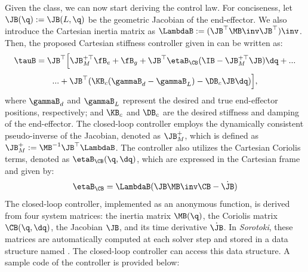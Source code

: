 Given the  class, we can now start deriving the control law. For conciseness, let $\JB(\q) := \JB(L,\q)$ be the geometric Jacobian of the end-effector. We also introduce the Cartesian inertia matrix as $\LambdaB := (\JB^\top \MB \inv \JB^\top)\inv$. Then, the proposed Cartesian stiffness controller given in \cite{DellaSantina2019Nov} can be written as:
%
\begin{multline}
    \tauB = \JB^\top \Big[\JB_M^{+\top} \fB_{e} + \fB_{g} + \JB^\top \etaB_{\CB}(\IB - \JB_M^{+\top}\JB)\dq + ... \\[0.25em] ... + \JB^\top(\KB_{c} (\gammaB_d - \gammaB_L) - \DB_c \JB \dq) \Big ],
    \label{eq:C5:dellasantina_controller}
\end{multline}
%
where $\gammaB_d$ and $\gammaB_L$ represent the desired and true end-effector positions, respectively; and $\KB_c$ and $\DB_c$ are the desired stiffness and damping of the end-effector. The closed-loop controller employs the dynamically consistent pseudo-inverse of the Jacobian, denoted as $\JB_M^{+}$, which is defined as $\JB_M^{+} := \MB^{-1} \JB^\top \LambdaB$. The controller also utilizes the Cartesian Coriolis terms, denoted as $\etaB_{\CB}(\q,\dq)$, which are expressed in the Cartesian frame and given by:
%
\begin{equation}
    \etaB_{\CB} = \LambdaB (\JB \MB\inv \CB - \dot{\JB})
\end{equation}
%
The closed-loop controller, implemented as an anonymous function, is derived from four system matrices: the inertia matrix $\MB(\q)$, the Coriolis matrix $\CB(\q,\dq)$, the Jacobian $\JB$, and its time derivative $\dot{\JB}$. In \textit{Sorotoki}, these matrices are automatically computed at each solver step and stored in a data structure named . The closed-loop controller can access this data structure. A sample code of the controller is provided below:

